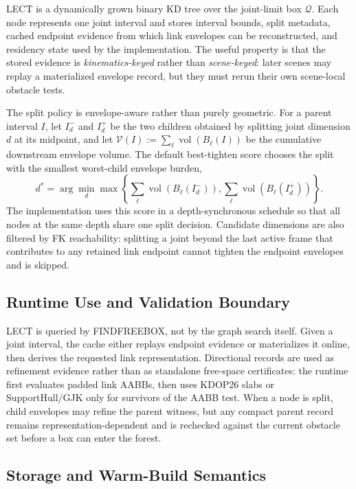\documentclass[journal]{IEEEtran}
\DeclareRobustCommand{\textsc}[1]{\textnormal{\MakeUppercase{#1}}}
\newcommand{\Q}{\ensuremath{\mathcal{Q}}}
\begin{document}
LECT is a dynamically grown binary KD tree over the joint-limit box $\Q$. Each
node represents one joint interval and stores interval bounds, split metadata,
cached endpoint evidence from which link envelopes can be reconstructed, and
residency state used by the implementation. The useful property is that the
stored evidence is \emph{kinematics-keyed} rather than \emph{scene-keyed}: later
scenes may replay a materialized envelope record, but they must rerun their own
scene-local obstacle tests.

The split policy is envelope-aware rather than purely geometric. For a parent
interval $I$, let $I_d^{-}$ and $I_d^{+}$ be the two children obtained by
splitting joint dimension $d$ at its midpoint, and let
$\mathcal{V}(I) := \sum_{\ell} \operatorname{vol}(B_\ell(I))$ be the cumulative
downstream envelope volume. The default best-tighten score chooses the split
with the smallest worst-child envelope burden,
\[
d^* = \arg\min_d
\max\!\left\{\sum_{\ell}\operatorname{vol}(B_\ell(I_d^-)),
\sum_{\ell}\operatorname{vol}(B_\ell(I_d^+))\right\}.
\]
The implementation uses this score in a depth-synchronous schedule so that all
nodes at the same depth share one split decision. Candidate dimensions are also
filtered by FK reachability: splitting a joint beyond the last active frame that
contributes to any retained link endpoint cannot tighten the endpoint envelopes
and is skipped.

\subsection{Runtime Use and Validation Boundary}

LECT is queried by \textsc{FindFreeBox}, not by the graph search itself. Given a
joint interval, the cache either replays endpoint evidence or materializes it
online, then derives the requested link representation. Directional records are
used as refinement evidence rather than as standalone free-space certificates:
the runtime first evaluates padded link AABBs, then uses KDOP26 slabs or
SupportHull/GJK only for survivors of the AABB test. When a node is split, child
envelopes may refine the parent witness, but any compact parent record remains
representation-dependent and is rechecked against the current obstacle set
before a box can enter the forest.

\subsection{Storage and Warm-Build Semantics}\label{sec:lect_storage}
\end{document}
